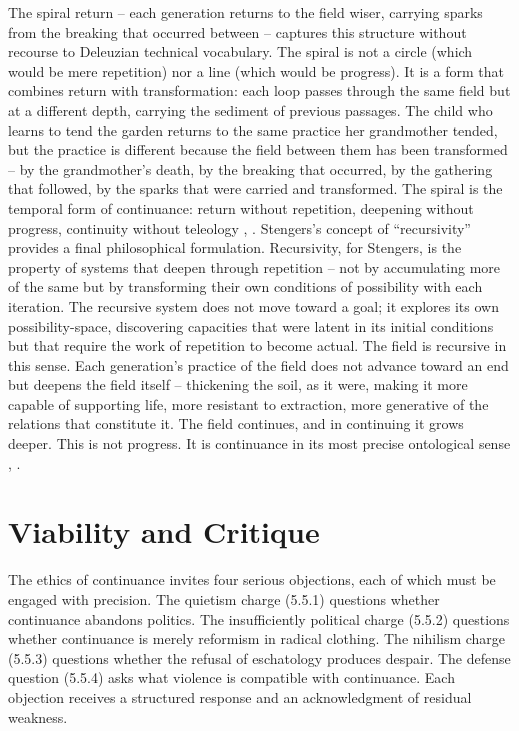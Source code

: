 The spiral return – each generation returns to the field wiser, carrying sparks from the breaking that occurred between – captures this structure without recourse to Deleuzian technical vocabulary. The spiral is not a circle (which would be mere repetition) nor a line (which would be progress). It is a form that combines return with transformation: each loop passes through the same field but at a different depth, carrying the sediment of previous passages. The child who learns to tend the garden returns to the same practice her grandmother tended, but the practice is different because the field between them has been transformed – by the grandmother’s death, by the breaking that occurred, by the gathering that followed, by the sparks that were carried and transformed. The spiral is the temporal form of continuance: return without repetition, deepening without progress, continuity without teleology \cite{chittick_1989}, \cite{deleuze_1968}. Stengers’s concept of “recursivity” provides a final philosophical formulation. Recursivity, for Stengers, is the property of systems that deepen through repetition – not by accumulating more of the same but by transforming their own conditions of possibility with each iteration. The recursive system does not move toward a goal; it explores its own possibility-space, discovering capacities that were latent in its initial conditions but that require the work of repetition to become actual. The field is recursive in this sense. Each generation’s practice of the field does not advance toward an end but deepens the field itself – thickening the soil, as it were, making it more capable of supporting life, more resistant to extraction, more generative of the relations that constitute it. The field continues, and in continuing it grows deeper. This is not progress. It is continuance in its most precise ontological sense \cite{stengers_2015}, \cite{hui_2019}.

\section{Viability and Critique}

The ethics of continuance invites four serious objections, each of which must be engaged with precision. The quietism charge (5.5.1) questions whether continuance abandons politics. The insufficiently political charge (5.5.2) questions whether continuance is merely reformism in radical clothing. The nihilism charge (5.5.3) questions whether the refusal of eschatology produces despair. The defense question (5.5.4) asks what violence is compatible with continuance. Each objection receives a structured response and an acknowledgment of residual weakness.

